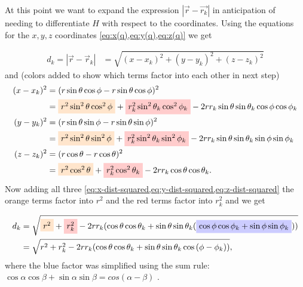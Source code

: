 At this point we want to expand the expression \(\left| \vec{r} - \vec{r_k} \right|\) in anticipation of needing to differentiate \(H\) with respect to the coordinates. Using the equations for the \(x, y, z\) coordinates \cref{eq:x(q),eq:y(q),eq:z(q)} we get

\begin{align}
    d_k = \left|\vec{r} - \vec{r}_k \right| &= \sqrt{(x-x_k)^2 + (y-y_k)^2 + (z-z_k)^2}
\end{align}
and (colors added to show which terms factor into each other in next step)
\begin{align}
    (x-x_k)^2 &= (r\sin{\theta}\cos{\phi} - r\sin{\theta}\cos{\phi})^2 \notag \\
    &= \tikz[baseline]{
        \node[fill=orange!20,anchor=base]
        {\(r^2\sin^2{\theta}\cos^2{\phi}\)}
    } + \tikz[baseline]{
        \node[fill=red!20,anchor=base]
        {\(r_k^2\sin^2{\theta_k}\cos^2{\phi_k}\)}
    } - 2r r_k \sin{\theta}\sin{\theta_k}\cos{\phi}\cos{\phi_k} \label{eq:x-dist-squared} \\
    (y-y_k)^2 &= (r\sin{\theta}\sin{\phi} - r\sin{\theta}\sin{\phi})^2 \notag \\
    &= \tikz[baseline]{
        \node[fill=orange!20,anchor=base]
        {\(r^2\sin^2{\theta}\sin^2{\phi}\)}
    } + \tikz[baseline]{
        \node[fill=red!20,anchor=base]
        {\(r_k^2\sin^2{\theta_k}\sin^2{\phi_k}\)}
    } - 2r r_k \sin{\theta}\sin{\theta_k}\sin{\phi}\sin{\phi_k} \label{eq:y-dist-squared} \\
    (z-z_k)^2 &= (r\cos{\theta} - r\cos{\theta})^2 \notag \\
    &= \tikz[baseline]{
        \node[fill=orange!20,anchor=base]
        {\(r^2\cos^2{\theta}\)}
    } + \tikz[baseline]{
        \node[fill=red!20,anchor=base]
        {\(r_k^2\cos^2{\theta_k}\)}
    } - 2r r_k \cos{\theta}\cos{\theta_k}. \label{eq:z-dist-squared}
\end{align}
Now adding all three \cref{eq:x-dist-squared,eq:y-dist-squared,eq:z-dist-squared} the orange terms factor into \(r^2\) and the red terms factor into \(r_k^2\) and we get

\begin{align}
    d_k &= \sqrt{
        \tikz[baseline]{\node[fill=orange!20,anchor=base]{\(r^2\)}}
        + \tikz[baseline]{\node[fill=red!20,anchor=base]{\(r_k^2\)}}
        -2r r_k(\cos{\theta}\cos{\theta_k}+\sin{\theta}\sin{\theta_k}(
            \tikz[baseline]{\node[fill=blue!20,anchor=base]{
                \(\cos{\phi}\cos{\phi_k} + \sin{\phi}\sin{\phi_k}\)}}
        ))
    } \\
    &= \sqrt{r^2 + r_k^2 - 2 r r_k(\cos{\theta}\cos{\theta_k}+\sin{\theta}\sin{\theta_k}\cos{(\phi - \phi_k}))},
\end{align}
where the blue factor was simplified using the sum rule: \\
\(\cos{\alpha}\cos{\beta} + \sin{\alpha}\sin{\beta} = cos{(\alpha-\beta)}\) \cite{WeissteinTrig}.

